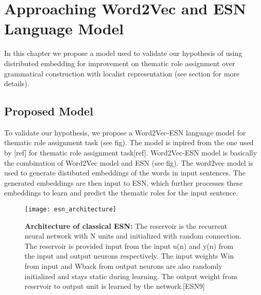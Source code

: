 \chapter{Approaching Word2Vec and ESN Language Model}\label{approach}

In this chapter we propose a model used to validate our hypothesis of using distributed embedding for improvement on thematic role assignment over grammatical construction with localist representation (see section for more details).

\section{Proposed Model}

To validate our hypothesis, we propose a Word2Vec-ESN language model for thematic role assignment task (see fig). The model is inpired from the one used by [ref] for thematic role assignment task[ref]. Word2Vec-ESN model is basically the combination of Word2Vec model and ESN (see fig). The word2vec model is used to generate distibuted embeddings of the words in input sentences. The generated embeddings are then input to ESN, which further processes these embeddings to learn and predict the thematic roles for the input sentence. 

\begin{figure}[hbtp]
\centering
\texttt{[image: esn\_architecture]}
\caption{\textbf{Architecture of classical ESN:} The reservoir is the recurrent neural network with N units and initialized with random connection. The reservoir is provided input from the input u(n) and y(n) from the input and output neurons  respectively. The input weights Win from input and Wback from output neurons are also randomly initialized and stays static during learning. The output  weight from reservoir to output unit is learned by the network.[ESN9]}
\label{fig:esn_arch}
\end{figure}

